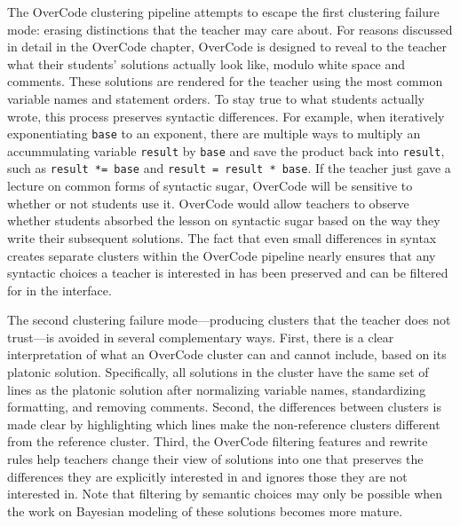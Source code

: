 \documentclass[12pt,twoside]{mitthesis}
\begin{document}
The OverCode clustering pipeline attempts to escape the first clustering failure mode: erasing distinctions that the teacher may care about. For reasons discussed in detail in the OverCode chapter, OverCode is designed to reveal to the teacher what their students' solutions actually look like, modulo white space and comments. These solutions are rendered for the teacher using the most common variable names and statement orders. To stay true to what students actually wrote, this process preserves syntactic differences. For example, when iteratively exponentiating \texttt{base} to an exponent, there are multiple ways to multiply an accummulating variable \texttt{result} by \texttt{base} and save the product back into \texttt{result}, such as \texttt{result *= base} and \texttt{result = result * base}. If the teacher just gave a lecture on common forms of syntactic sugar, OverCode will be sensitive to whether or not students use it. OverCode would allow teachers to observe whether students absorbed the lesson on syntactic sugar based on the way they write their subsequent solutions. The fact that even small differences in syntax creates separate clusters within the OverCode pipeline nearly ensures that any syntactic choices a teacher is interested in has been preserved and can be filtered for in the interface.



The second clustering failure mode---producing clusters that the teacher does not trust---is avoided in several complementary ways. First, there is a clear interpretation of what an OverCode cluster can and cannot include, based on its platonic solution. Specifically, all solutions in the cluster have the same set of lines as the platonic solution after normalizing variable names, standardizing formatting, and removing comments. Second, the differences between clusters is made clear by highlighting which lines make the non-reference clusters different from the reference cluster. Third, the OverCode filtering features and rewrite rules help teachers change their view of solutions into one that preserves the differences they are explicitly interested in and ignores those they are not interested in. Note that filtering by semantic choices may only be possible when the work on Bayesian modeling of these solutions becomes more mature. 
\end{document}
